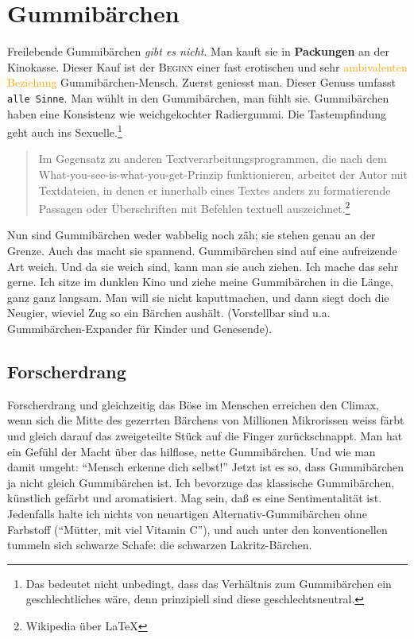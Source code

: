 
\chapter{Gummibärchen}

Freilebende Gummibärchen \emph{gibt es nicht}. Man kauft sie in \textbf{Packungen} an der Kinokasse. Dieser Kauf ist der \textsc{Beginn} einer fast erotischen und sehr \textcolor{orange}{ambivalenten Beziehung} Gummibärchen-Mensch. Zuerst geniesst man. Dieser Genuss umfasst \texttt{alle Sinne}. Man wühlt in den Gummibärchen, man fühlt sie. Gummibärchen haben eine Konsistenz wie weichgekochter Radiergummi. Die Tastempfindung geht auch ins Sexuelle.\footnote{Das bedeutet nicht unbedingt, dass das Verhältnis zum Gummibärchen ein geschlechtliches wäre, denn prinzipiell sind diese geschlechtsneutral.}

\begin{quote}
  Im Gegensatz zu anderen Textverarbeitungsprogrammen, die nach dem What-you-see-is-what-you-get-Prinzip funktionieren, arbeitet der Autor mit Textdateien, in denen er innerhalb eines Textes anders zu formatierende Passagen oder Überschriften mit Befehlen textuell auszeichnet.\footnote{Wikipedia über LaTeX}
\end{quote}

Nun sind Gummibärchen weder wabbelig noch zäh; sie stehen genau an der Grenze. Auch das macht sie spannend. Gummibärchen sind auf eine aufreizende Art weich. Und da sie weich sind, kann man sie auch ziehen. Ich mache das sehr gerne. Ich sitze im dunklen Kino und ziehe meine Gummibärchen in die Länge, ganz ganz langsam. Man will sie nicht kaputtmachen, und dann siegt doch die Neugier, wieviel Zug so ein Bärchen aushält. (Vorstellbar sind u.a. Gummibärchen-Expander für Kinder und Genesende).

\section{Forscherdrang}

Forscherdrang und gleichzeitig das Böse im Menschen erreichen den Climax, wenn sich die Mitte des gezerrten Bärchens von Millionen Mikrorissen weiss färbt und gleich darauf das zweigeteilte Stück auf die Finger zurückschnappt. Man hat ein Gefühl der Macht über das hilflose, nette Gummibärchen. Und wie man damit umgeht: \enquote{Mensch erkenne dich selbst!} Jetzt ist es so, dass Gummibärchen ja nicht gleich Gummibärchen ist. Ich bevorzuge das klassische Gummibärchen, künstlich gefärbt und aromatisiert. Mag sein, daß es eine Sentimentalität ist. Jedenfalls halte ich nichts von neuartigen Alternativ-Gummibärchen ohne Farbstoff (\enquote{Mütter, mit viel Vitamin C}), und auch unter den konventionellen tummeln sich schwarze Schafe: die schwarzen Lakritz-Bärchen.


